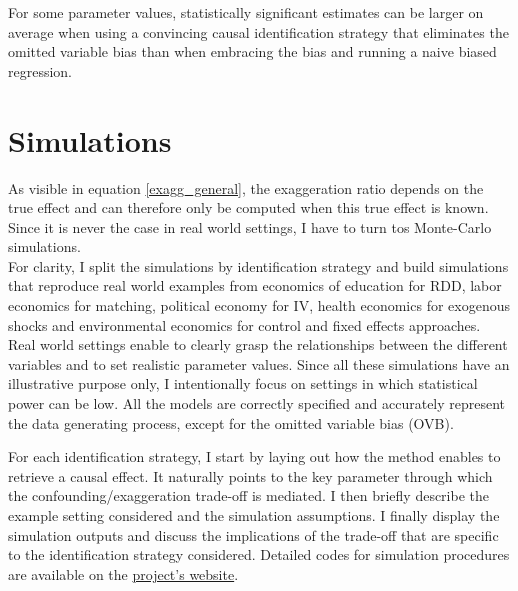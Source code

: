 \documentclass[usletter, 12pt]{article}
\begin{document}
			For some parameter values, statistically significant estimates can be larger on average when using a convincing causal identification strategy that eliminates the omitted variable bias than when embracing the bias and running a naive biased regression.	
	


				
	\section{Simulations} \label{simulations}
		
		 As visible in equation \ref{exagg_general},  the exaggeration ratio depends on the true effect and can therefore only be computed when this true effect is known. Since it is never the case in real world settings, I have to turn tos Monte-Carlo simulations.\\
    
    For clarity, I split the simulations by identification strategy %
    and build simulations that reproduce real world examples from economics of education for RDD, labor economics for matching, political economy for IV, health economics for exogenous shocks and environmental economics for control and fixed effects approaches. Real world settings enable to clearly grasp the relationships between the different variables and to set realistic parameter values. Since all these simulations have an illustrative purpose only, I intentionally focus on settings in which statistical power can be low. All the models are correctly specified and accurately represent the data generating process, except for the omitted variable bias (OVB).
    
     		For each identification strategy, I start by laying out how the method enables to retrieve a causal effect. It naturally points to the key parameter through which the confounding/exaggeration trade-off is mediated. I then briefly describe the example setting considered and the simulation assumptions. I finally display the simulation outputs and discuss the implications of the trade-off that are specific to the identification strategy considered. Detailed codes for simulation procedures are available on the \href{https://vincentbagilet.github.io/causal_inflation/}{project's website}.
		
\end{document}
